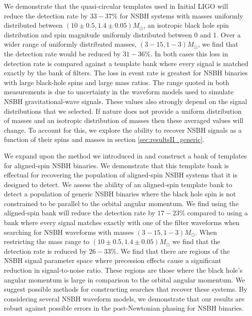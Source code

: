 We demonstrate
that the quasi-circular templates used in Initial LIGO will reduce the detection
rate by $33 - 37\%$ for \ac{NSBH} systems with masses uniformly distributed 
between
$(10\pm0.5,1.4\pm0.05)M_{\odot}$, an isotropic black hole spin distribution and 
spin magnitude uniformly distributed between 0 and 1. Over a wider range of 
uniformly distributed masses, $(3-15,1-3)M_{\odot}$, we find that the detection 
rate would be reduced
by $31 - 36\%$. In both cases this loss in detection rate is 
compared against a template bank where every signal is matched
exactly by the bank of filters. The loss in event rate is greatest for
\ac{NSBH} binaries with large black-hole spins and large mass ratios. The range
quoted in both measurements is due to uncertainty in the waveform models used to
simulate \ac{NSBH} gravitational-wave signals. These values also strongly 
depend on the signal distributions that we selected. If nature does not provide 
a uniform distribution of masses and an isotropic distribution of masses then 
these averaged values will change. To account for this, we explore the ability 
to recover \ac{NSBH} signals as a function of their spins and masses in section 
\ref{sec:resultsII_generic}.

We expand upon the method we
introduced in \cite{Brown:2012qf} and
construct a bank of templates for aligned-spin \ac{NSBH} binaries. We
demonstrate that this template bank is effectual for recovering the population
of aligned-spin \ac{NSBH} systems that it is designed to detect. We
assess the ability of an aligned-spin template bank to detect a population of
generic
\ac{NSBH} binaries where the black hole spin is not constrained to be parallel
to the orbital angular momentum. We find using the aligned-spin
bank will reduce the detection rate by $17-23\%$ compared to using a bank where
every signal matches exactly with one of the filter waveforms when searching 
for \ac{NSBH} waveforms with masses $(3-15,1-3)M_{\odot}$. When restricting the 
mass range to $(10\pm0.5,1.4\pm0.05)M_{\odot}$ we find that the detection rate 
is reduced by $26-33\%$. We find that
there are regions of the \ac{NSBH} signal parameter space where precession
effects cause a significant reduction in signal-to-noise ratio. These regions 
are those where the black hole's angular momentum is large in comparison to 
the orbital angular momentum. We suggest possible methods for constructing 
searches that recover these systems. By considering several \ac{NSBH} waveform 
models, we demonstrate that our results are robust against possible errors in 
the post-Newtonian phasing for \ac{NSBH} binaries.

